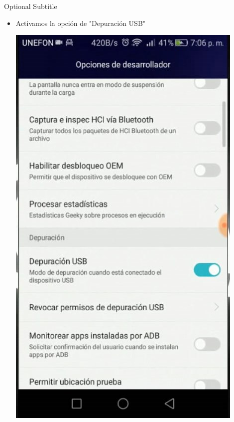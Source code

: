 \documentclass{beamer}
\begin{document}
\begin{frame}{02}{Optional Subtitle}
  \begin{itemize}
  \item {
    Activamos la opción de "Depuración USB"
  }
  
  \includegraphics[height=0.7\paperheight]{image2/UR02}
  \centering
  \end{itemize}
\end{frame}
\end{document}
